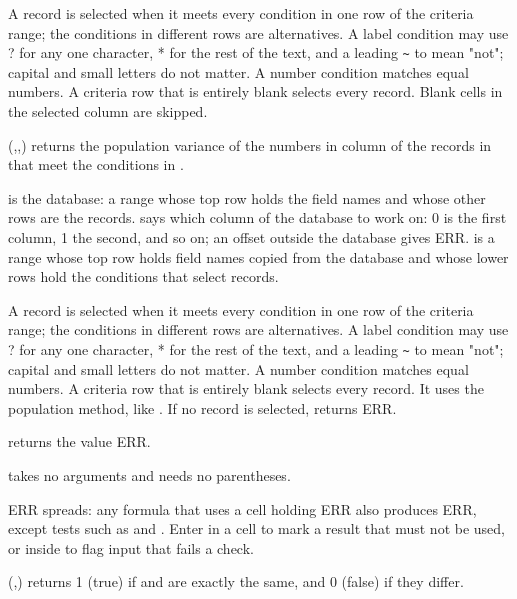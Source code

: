 A record is selected when it meets every condition in one row of the criteria range; the conditions in different rows are alternatives. A label condition may use ? for any one character, * for the rest of the text, and a leading \texttt{\textasciitilde} to mean "not"; capital and small letters do not matter. A number condition matches equal numbers. A criteria row that is entirely blank selects every record. Blank cells in the selected column are skipped.

\Examples
{}

(,,) returns the population variance of the numbers in column  of the records in  that meet the conditions in .

 is the database: a range whose top row holds the field names and whose other rows are the records.  says which column of the database to work on: 0 is the first column, 1 the second, and so on; an offset outside the database gives ERR.  is a range whose top row holds field names copied from the database and whose lower rows hold the conditions that select records.

A record is selected when it meets every condition in one row of the criteria range; the conditions in different rows are alternatives. A label condition may use ? for any one character, * for the rest of the text, and a leading \texttt{\textasciitilde} to mean "not"; capital and small letters do not matter. A number condition matches equal numbers. A criteria row that is entirely blank selects every record. It uses the population method, like . If no record is selected,  returns ERR.

\Examples
{}

 returns the value ERR.

 takes no arguments and needs no parentheses.

ERR spreads: any formula that uses a cell holding ERR also produces ERR, except tests such as  and . Enter  in a cell to mark a result that must not be used, or inside  to flag input that fails a check.

\Examples
{}

(,) returns 1 (true) if  and  are exactly the same, and 0 (false) if they differ.

